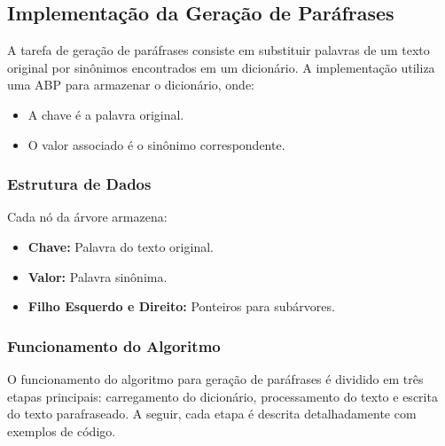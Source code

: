 \documentclass[a4paper, 12pt, english]{article}
\begin{document}
\newpage
\subsection{Implementação da Geração de Paráfrases}
A tarefa de geração de paráfrases consiste em substituir palavras de um texto original por sinônimos encontrados em um dicionário. A implementação utiliza uma ABP para armazenar o dicionário, onde:
\begin{itemize}
    \item A chave é a palavra original.
    \item O valor associado é o sinônimo correspondente.
\end{itemize}

\subsubsection{Estrutura de Dados}
Cada nó da árvore armazena:
\begin{itemize}
    \item \textbf{Chave:} Palavra do texto original.
    \item \textbf{Valor:} Palavra sinônima.
    \item \textbf{Filho Esquerdo e Direito:} Ponteiros para subárvores.
\end{itemize}

\subsubsection{Funcionamento do Algoritmo}
O funcionamento do algoritmo para geração de paráfrases é dividido em três etapas principais: carregamento do dicionário, processamento do texto e escrita do texto parafraseado. A seguir, cada etapa é descrita detalhadamente com exemplos de código.
\end{document}
